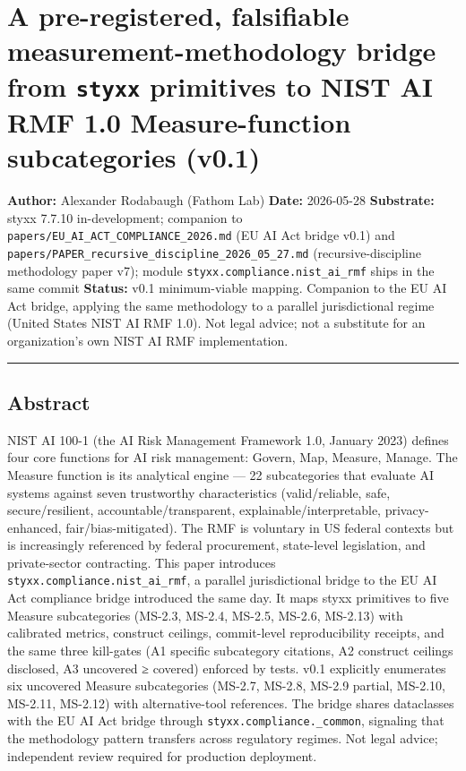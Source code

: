 \documentclass[
]{article}
\author{}
\date{}
\begin{document}
\section{\texorpdfstring{A pre-registered, falsifiable
measurement-methodology bridge from \texttt{styxx} primitives to NIST AI
RMF 1.0 Measure-function subcategories
(v0.1)}{A pre-registered, falsifiable measurement-methodology bridge from styxx primitives to NIST AI RMF 1.0 Measure-function subcategories (v0.1)}}\label{a-pre-registered-falsifiable-measurement-methodology-bridge-from-styxx-primitives-to-nist-ai-rmf-1.0-measure-function-subcategories-v0.1}

\textbf{Author:} Alexander Rodabaugh (Fathom Lab) \textbf{Date:}
2026-05-28 \textbf{Substrate:} styxx 7.7.10 in-development; companion to
\texttt{papers/EU\_AI\_ACT\_COMPLIANCE\_2026.md} (EU AI Act bridge v0.1)
and \texttt{papers/PAPER\_recursive\_discipline\_2026\_05\_27.md}
(recursive-discipline methodology paper v7); module
\texttt{styxx.compliance.nist\_ai\_rmf} ships in the same commit
\textbf{Status:} v0.1 minimum-viable mapping. Companion to the EU AI Act
bridge, applying the same methodology to a parallel jurisdictional
regime (United States NIST AI RMF 1.0). Not legal advice; not a
substitute for an organization's own NIST AI RMF implementation.

\begin{center}\rule{0.5\linewidth}{0.5pt}\end{center}

\subsection{Abstract}\label{abstract}

NIST AI 100-1 (the AI Risk Management Framework 1.0, January 2023)
defines four core functions for AI risk management: Govern, Map,
Measure, Manage. The Measure function is its analytical engine --- 22
subcategories that evaluate AI systems against seven trustworthy
characteristics (valid/reliable, safe, secure/resilient,
accountable/transparent, explainable/interpretable, privacy-enhanced,
fair/bias-mitigated). The RMF is voluntary in US federal contexts but is
increasingly referenced by federal procurement, state-level legislation,
and private-sector contracting. This paper introduces
\texttt{styxx.compliance.nist\_ai\_rmf}, a parallel jurisdictional
bridge to the EU AI Act compliance bridge introduced the same day. It
maps styxx primitives to five Measure subcategories (MS-2.3, MS-2.4,
MS-2.5, MS-2.6, MS-2.13) with calibrated metrics, construct ceilings,
commit-level reproducibility receipts, and the same three kill-gates (A1
specific subcategory citations, A2 construct ceilings disclosed, A3
uncovered ≥ covered) enforced by tests. v0.1 explicitly enumerates six
uncovered Measure subcategories (MS-2.7, MS-2.8, MS-2.9 partial,
MS-2.10, MS-2.11, MS-2.12) with alternative-tool references. The bridge
shares dataclasses with the EU AI Act bridge through
\texttt{styxx.compliance.\_common}, signaling that the methodology
pattern transfers across regulatory regimes. Not legal advice;
independent review required for production deployment.
\end{document}
